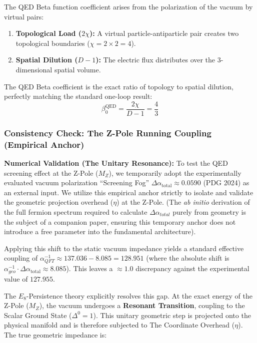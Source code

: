 The QED Beta function coefficient arises from the polarization of the vacuum by virtual pairs:
\begin{enumerate}
    \item \textbf{Topological Load ($2\chi$):} A virtual particle-antiparticle pair creates two topological boundaries ($\chi=2 \times 2 = 4$).
    \item \textbf{Spatial Dilution ($D-1$):} The electric flux distributes over the 3-dimensional spatial volume.
\end{enumerate}

The QED Beta coefficient is the exact ratio of topology to spatial dilution, perfectly matching the standard one-loop result:
\begin{equation}
    \beta_0^{\text{QED}} = \frac{2\chi}{D-1} = \frac{4}{3}
\end{equation}

\subsubsection{Consistency Check: The Z-Pole Running Coupling (Empirical Anchor)}
\textbf{Numerical Validation (The Unitary Resonance):}
To test the QED screening effect at the Z-Pole ($M_Z$), we temporarily adopt the experimentally evaluated vacuum polarization ``Screening Fog'' $\Delta \alpha_{\text{total}} \approx 0.0590$ (PDG 2024) as an external input. We utilize this empirical anchor strictly to isolate and validate the geometric projection overhead ($\eta$) at the Z-Pole. (The \textit{ab initio} derivation of the full fermion spectrum required to calculate $\Delta\alpha_{total}$ purely from geometry is the subject of a companion paper, ensuring this temporary anchor does not introduce a free parameter into the fundamental architecture). 

Applying this shift to the static vacuum impedance yields a standard effective coupling of $\alpha^{-1}_{QFT} \approx 137.036 - 8.085 = 128.951$ (where the absolute shift is $\alpha^{-1}_{geo} \cdot \Delta \alpha_{\text{total}} \approx 8.085$). This leaves a $\approx 1.0$ discrepancy against the experimental value of $127.955$.

The $E_8$-Persistence theory explicitly resolves this gap. At the exact energy of the Z-Pole ($M_Z$), the vacuum undergoes a \textbf{Resonant Transition}, coupling to the Scalar Ground State ($\Delta^0 = 1$). This unitary geometric step is projected onto the physical manifold and is therefore subjected to The Coordinate Overhead ($\eta$). The true geometric impedance is:

